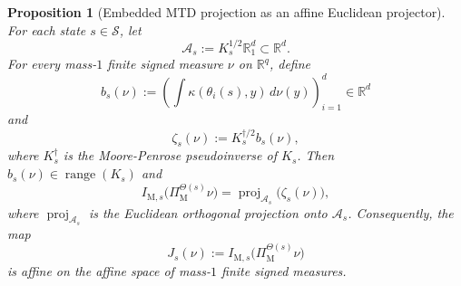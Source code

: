 \documentclass[10pt,a4paper]{amsart}
\newtheorem{proposition}{Proposition}
\newcommand{\X}{\mathcal{S}}
\begin{document}
\begin{proposition}[Embedded MTD projection as an affine Euclidean projector]
\label{prop:mtd-proj-affine}
For each state $s \in \X$, let
\begin{equation}
\mathcal A_s := K_s^{1/2}\mathbb R_1^d \subset \mathbb R^d .
\end{equation}
For every mass-$1$ finite signed measure $\nu$ on $\mathbb R^q$, define
\begin{equation}
b_s(\nu) := \left( \int \kappa(\theta_i(s),y)\,d\nu(y) \right)_{i=1}^d \in \mathbb R^d
\end{equation}
and
\begin{equation}
\zeta_s(\nu) := K_s^{\dagger/2} b_s(\nu),
\end{equation}
where $K_s^\dagger$ is the Moore-Penrose pseudoinverse of $K_s$. Then $b_s(\nu) \in \operatorname{range}(K_s)$ and
\begin{equation}
I_{\mathrm M,s}\bigl(\Pi_{\mathrm M}^{\Theta(s)}\nu\bigr) = \operatorname{proj}_{\mathcal A_s}\bigl(\zeta_s(\nu)\bigr),
\end{equation}
where $\operatorname{proj}_{\mathcal A_s}$ is the Euclidean orthogonal projection onto $\mathcal A_s$. Consequently, the map
\begin{equation}
J_s(\nu) := I_{\mathrm M,s}\bigl(\Pi_{\mathrm M}^{\Theta(s)}\nu\bigr)
\end{equation}
is affine on the affine space of mass-$1$ finite signed measures.
\end{proposition}
\end{document}
